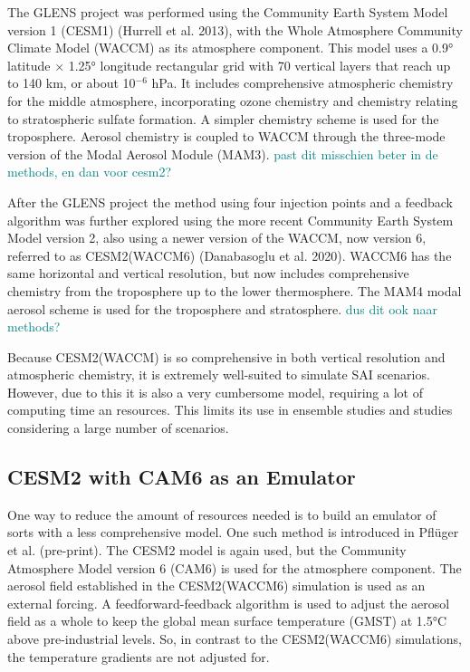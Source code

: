 The GLENS project was performed using the Community Earth System Model version 1 (CESM1) (Hurrell et al. 2013), with the Whole Atmosphere Community Climate Model (WACCM) as its atmosphere component. This model uses a 0.9° latitude $\times$ 1.25° longitude rectangular grid with 70 vertical layers that reach up to 140 km, or about 10$^{-6}$ hPa. It includes comprehensive atmospheric chemistry for the middle atmosphere, incorporating ozone chemistry and chemistry relating to stratospheric sulfate formation. A simpler chemistry scheme is used for the troposphere. Aerosol chemistry is coupled to WACCM through the three-mode version of the Modal Aerosol Module (MAM3). \textcolor{teal}{past dit misschien beter in de methods, en dan voor cesm2?}

After the GLENS project the method using four injection points and a feedback algorithm was further explored using the more recent Community Earth System Model version 2, also using a newer version of the WACCM, now version 6, referred to as CESM2(WACCM6) (Danabasoglu et al. 2020). WACCM6 has the same horizontal and vertical resolution, but now includes comprehensive chemistry from the troposphere up to the lower thermosphere. The MAM4 modal aerosol scheme is used for the troposphere and stratosphere. \textcolor{teal}{dus dit ook naar methods? }

Because CESM2(WACCM) is so comprehensive in both vertical resolution and atmospheric chemistry, it is extremely well-suited to simulate SAI scenarios. However, due to this it is also a very cumbersome model, requiring a lot of computing time an resources. This limits its use in ensemble studies and studies considering a large number of scenarios. 

\subsection{CESM2 with CAM6 as an Emulator}
One way to reduce the amount of resources needed is to build an emulator of sorts with a less comprehensive model. One such method is introduced in Pflüger et al. (pre-print). The CESM2 model is again used, but the Community Atmosphere Model version 6 (CAM6) is used for the atmosphere component. The aerosol field established in the CESM2(WACCM6) simulation is used as an external forcing. A feedforward-feedback algorithm is used to adjust the aerosol field as a whole to keep the global mean surface temperature (GMST) at 1.5°C above pre-industrial levels. So, in contrast to the CESM2(WACCM6) simulations, the temperature gradients are not adjusted for. 

